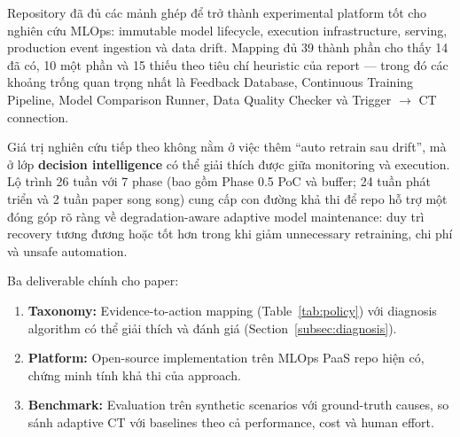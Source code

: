 \documentclass[11pt,a4paper]{article}
\begin{document}
Repository đã đủ các mảnh ghép để trở thành experimental platform tốt cho nghiên cứu MLOps: immutable model lifecycle, execution infrastructure, serving, production event ingestion và data drift. Mapping đủ 39 thành phần cho thấy 14 đã có, 10 một phần và 15 thiếu theo tiêu chí heuristic của report --- trong đó các khoảng trống quan trọng nhất là Feedback Database, Continuous Training Pipeline, Model Comparison Runner, Data Quality Checker và Trigger $\rightarrow$ CT connection.

Giá trị nghiên cứu tiếp theo không nằm ở việc thêm ``auto retrain sau drift'', mà ở lớp \textbf{decision intelligence} có thể giải thích được giữa monitoring và execution. Lộ trình 26 tuần với 7 phase (bao gồm Phase 0.5 PoC và buffer; 24 tuần phát triển và 2 tuần paper song song) cung cấp con đường khả thi để repo hỗ trợ một đóng góp rõ ràng về degradation-aware adaptive model maintenance: duy trì recovery tương đương hoặc tốt hơn trong khi giảm unnecessary retraining, chi phí và unsafe automation.

Ba deliverable chính cho paper:
\begin{enumerate}
  \item \textbf{Taxonomy:} Evidence-to-action mapping (Table~\ref{tab:policy}) với diagnosis algorithm có thể giải thích và đánh giá (Section~\ref{subsec:diagnosis}).
  \item \textbf{Platform:} Open-source implementation trên MLOps PaaS repo hiện có, chứng minh tính khả thi của approach.
  \item \textbf{Benchmark:} Evaluation trên synthetic scenarios với ground-truth causes, so sánh adaptive CT với baselines theo cả performance, cost và human effort.
\end{enumerate}
\end{document}
